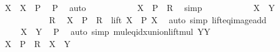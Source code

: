\begin{isabellebody}
\ {\isachardoublequoteopen}X\ {\isasymle}\ X\ {\isacharasterisk}{\kern0pt}\ P{\isachardoublequoteclose}\ \isamarkupfalse%
\ P\ \isamarkupfalse%
\ auto\isanewline
\ \ \ \ \ \ \isamarkupfalse%
\ \isamarkupfalse%
\ {\isachardoublequoteopen}{\isachardot}{\kern0pt}{\isachardot}{\kern0pt}{\isachardot}{\kern0pt}\ {\isasymle}\ X\ {\isacharasterisk}{\kern0pt}\ P\ {\isacharplus}{\kern0pt}\ R{\isachardoublequoteclose}\ \isamarkupfalse%
\ simp\isanewline
\ \ \ \ \ \ \isamarkupfalse%
\ \isamarkupfalse%
\ {\isachardoublequoteopen}{\isachardot}{\kern0pt}{\isachardot}{\kern0pt}{\isachardot}{\kern0pt}\ {\isasymle}\ X\ {\isacharasterisk}{\kern0pt}\ Y{\isachardoublequoteclose}\isanewline
\ \ \ \ \ \ \isamarkupfalse%
\ {\isacharminus}{\kern0pt}\isanewline
\ \ \ \ \ \ \ \ \isamarkupfalse%
\ R\ \isamarkupfalse%
\ {\isachardoublequoteopen}X\ {\isacharasterisk}{\kern0pt}\ P\ {\isacharplus}{\kern0pt}\ R\ {\isasymin}\ lift\ {\isacharparenleft}{\kern0pt}X\ {\isacharasterisk}{\kern0pt}\ P{\isacharparenright}{\kern0pt}\ X{\isachardoublequoteclose}\ \isamarkupfalse%
\ {\isacharparenleft}{\kern0pt}auto\ simp{\isacharcolon}{\kern0pt}\ lift{\isacharunderscore}{\kern0pt}eq{\isacharunderscore}{\kern0pt}image{\isacharunderscore}{\kern0pt}add{\isacharparenright}{\kern0pt}\isanewline
\ \ \ \ \ \ \ \ \isamarkupfalse%
\ \isamarkupfalse%
\ {\isachardoublequoteopen}{\isachardot}{\kern0pt}{\isachardot}{\kern0pt}{\isachardot}{\kern0pt}\ {\isasymsubseteq}\ X\ {\isacharasterisk}{\kern0pt}\ Y{\isachardoublequoteclose}\ \isamarkupfalse%
\ P\ \isamarkupfalse%
\ {\isacharparenleft}{\kern0pt}auto\ simp{\isacharcolon}{\kern0pt}\ mul{\isacharunderscore}{\kern0pt}eq{\isacharunderscore}{\kern0pt}idx{\isacharunderscore}{\kern0pt}union{\isacharunderscore}{\kern0pt}lift{\isacharunderscore}{\kern0pt}mul{\isacharbrackleft}{\kern0pt}\ {\isacharquery}{\kern0pt}Y{\isacharequal}{\kern0pt}Y{\isacharbrackright}{\kern0pt}{\isacharparenright}{\kern0pt}\isanewline
\ \ \ \ \ \ \ \ \isamarkupfalse%
\ \isamarkupfalse%
\ {\isachardoublequoteopen}X\ {\isacharasterisk}{\kern0pt}\ P\ {\isacharplus}{\kern0pt}\ R\ {\isasymin}\ X\ {\isacharasterisk}{\kern0pt}\ Y{\isachardoublequoteclose}\ \isacommand{{\isachardot}{\kern0pt}}\isamarkupfalse%
\isanewline
\ \ \ \ \ \ \ \ \isamarkupfalse%
\ \isamarkupfalse%

\end{isabellebody}
